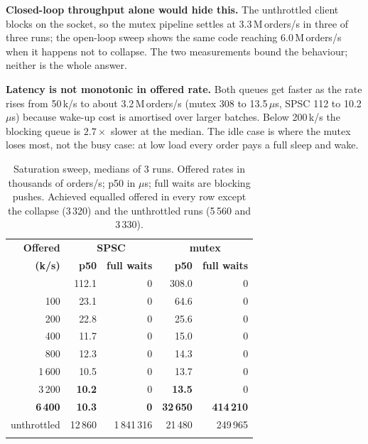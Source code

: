\documentclass[conference]{IEEEtran}
\newcommand{\us}{\,$\mu$s}
\newcommand{\Mops}{\,M\,orders/s}
\begin{document}
\textbf{Closed-loop throughput alone would hide this.} The unthrottled client
blocks on the socket, so the mutex pipeline settles at 3.3\Mops{} in three of
three runs; the open-loop sweep shows the same code reaching 6.0\Mops{} when it
happens not to collapse. The two measurements bound the behaviour; neither is
the whole answer.

\textbf{Latency is not monotonic in offered rate.} Both queues get faster as the
rate rises from 50\,k/s to about 3.2\Mops{} (mutex 308 to 13.5\us, SPSC 112 to
10.2\us) because wake-up cost is amortised over larger batches. Below
200\,k/s the blocking queue is $2.7\times$ slower at the median. The idle case is
where the mutex loses most, not the busy case: at low load every order pays a
full sleep and wake.

\begin{table}[!t]
\centering
\caption{Saturation sweep, medians of 3 runs. Offered rates in thousands of
orders/s; p50 in $\mu$s; full waits are blocking pushes. Achieved equalled
offered in every row except the collapse (3\,320) and the unthrottled runs
(5\,560 and 3\,330).}
\label{tab:saturation}
\small
\setlength{\tabcolsep}{4pt}
\begin{tabular}{@{}rrrrr@{}}
\arrayrulecolor{cblue}\toprule
\rowcolor{cblueL}\textbf{Offered} &
  \multicolumn{2}{c}{\cellcolor{cblue!22}\textbf{SPSC}} &
  \multicolumn{2}{c}{\cellcolor{corange!22}\textbf{mutex}} \\
\rowcolor{cblueL}\textbf{(k/s)} & \textbf{p50} & \textbf{full waits} &
  \textbf{p50} & \textbf{full waits} \\
\arrayrulecolor{cblue!45}\midrule
50     & 112.1 & 0 & 308.0 & 0 \\
100    & 23.1  & 0 & 64.6  & 0 \\
200    & 22.8  & 0 & 25.6  & 0 \\
400    & 11.7  & 0 & 15.0  & 0 \\
800    & 12.3  & 0 & 14.3  & 0 \\
1\,600 & 10.5  & 0 & 13.7  & 0 \\
3\,200 & \textbf{10.2} & 0 & \textbf{13.5} & 0 \\
\rowcolor{credL}\textbf{6\,400} & \textbf{10.3} & \textbf{0} &
  \textcolor{cred}{\textbf{32\,650}} & \textcolor{cred}{\textbf{414\,210}} \\
\rowcolor{credL}unthrottled & 12\,860 & 1\,841\,316 & 21\,480 & 249\,965 \\
\arrayrulecolor{cblue}\bottomrule
\end{tabular}
\end{table}
\end{document}
